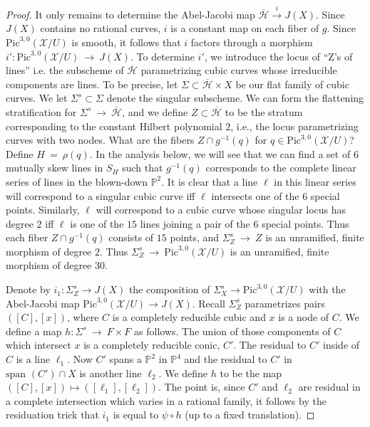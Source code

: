 \documentclass[twoside,12pt,reqno]{amsart}
\theoremstyle{plain}
\theoremstyle{definition}
\newcommand{\PP}{\mathbb{P}}
\def\ps{\vspace{4pt}}
\newcommand{\lt}{\left}
\newcommand{\rt}{\right}
\renewcommand{\xrightarrow}[1]{\mathbin{\stackrel{#1}{\longrightarrow}}}
\begin{document}
\begin{proof}
It only remains to determine the Abel-Jacobi map
$\overline{\mathcal{H}}\xrightarrow{i} 
J(X)$.  Since $J(X)$ contains no rational curves, $i$ is a
constant map on each fiber 
of $g$.  Since $\text{Pic}^{3,0}(\mathcal{X}/U)$ is smooth, it follows that $i$
factors through a morphism $i':\text{Pic}^{3,0}(\mathcal{X}/U)~\rightarrow~ J(X)$.  
To determine $i'$, we introduce the locus of ``Z's of lines'' i.e.
the subscheme of $\overline{\mathcal{H}}$ parametrizing cubic curves whose
irreducible components are lines.  To be precise, let $\Sigma\subset
\overline{\mathcal{H}}\times X$ be our
flat family of cubic curves.  We let $\Sigma^{s}\subset\Sigma$ denote the
singular subscheme.  We can form the flattening stratification for $\Sigma^{s}
~\rightarrow~ \overline{\mathcal{H}}$, and we define
$Z\subset\overline{\mathcal{H}}$ to be
the stratum corresponding to the constant Hilbert polynomial $2$,
i.e., the locus parametrizing curves with two nodes.  What are
the fibers $Z\cap g^{-1}(q)$ for $q\in \text{Pic}^{3,0}(\mathcal{X}/U)$?  
Define $H~=~\rho(q)$.  In the analysis below, we will see that we can
find a set of $6$ mutually skew lines in $S_H$ such that $g^{-1}(q)$
corresponds to the complete linear series of lines in the blown-down $\PP^2$.
It is clear that a line $\ell$ in this linear series will 
correspond to a singular
cubic curve iff $\ell$ intersects one of the $6$ special points.  Similarly, $\ell$ 
will correspond to a cubic curve whose singular locus has degree $2$ iff
$\ell$ is one of the $15$ lines joining a pair of the $6$ special points.
Thus each
fiber $Z\cap g^{-1}(q)$ consists of $15$ points, and  
$\Sigma_Z^{s}~\rightarrow~ 
Z$ is an unramified, finite morphism of degree $2$. Thus
$\Sigma_Z^s~\rightarrow~ \text{Pic}^{3,0}(\mathcal{X}/U)$ is an unramified, finite
morphism of degree $30$.  

\ps

Denote by $i_1:\Sigma^s_Z\rightarrow J(X)$ the composition of
$\Sigma^s_X\rightarrow \text{Pic}^{3,0}(\mathcal{X}/U)$ with the Abel-Jacobi map
$\text{Pic}^{3,0}(\mathcal{X}/U)\rightarrow J(X)$.
Recall $\Sigma_Z^{s}$ parametrizes pairs 
$\lt([C],[x]\rt)$, where $C$ is a completely reducible cubic and $x$ is 
a node of $C$.  We define a map $h:\Sigma^{s}~\rightarrow~ F\times F$ as
follows.  The union of those components of $C$ which intersect $x$ is a
completely reducible conic, $C'$.  The residual to $C'$ inside of $C$ is
a line $\ell_1$.  Now $C'$ spans a $\PP^2$ in $\PP^4$ and the residual to
$C'$ in $\text{span }(C')\cap X$ is another line $\ell_2$.  We define $h$
to be the map $\lt([C],[x]\rt)\mapsto\lt([\ell_1],[\ell_2]\rt)$.  The point is,
since $C'$ and $\ell_2$ are residual in a complete intersection which
varies in a rational family, it follows
by the residuation trick that $i_1$ is equal to $\psi\circ h$
(up to a fixed translation).  


\end{proof}
\end{document}
